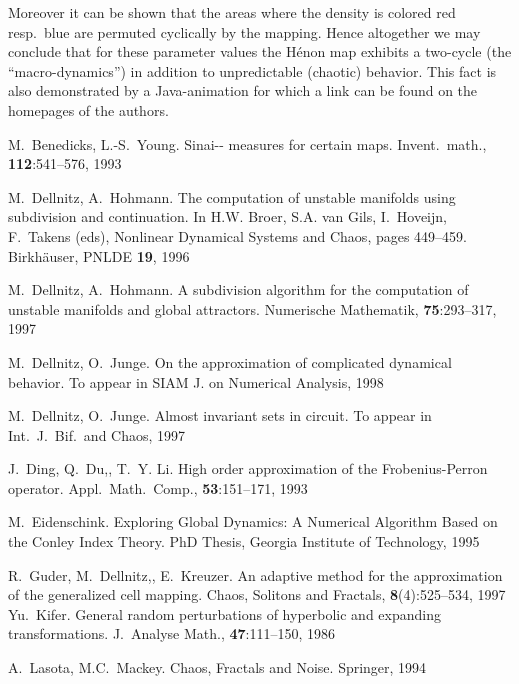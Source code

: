 \documentclass[cvs,envcountsect]{svjour}
\begin{document}
Moreover it can be shown that the areas
where the density is colored red resp.\ blue
are permuted cyclically by the mapping.  Hence altogether
we may conclude that for these parameter values the H\'enon
map exhibits a two-cycle (the ``macro-dynamics'') in addition to
unpredictable (chaotic) behavior.  This fact is also demonstrated
by a {\sf Java}-animation for which a link can be found on the
homepages of the authors.  \thisbottomragged



\begin{thebibliography}{10.}

M.\ Benedicks, L.-S.\ Young.
Sinai-- measures for certain
   maps.
{Invent.\ math.}, {\bf 112}:541--576, 1993

M.\ Dellnitz, A.\ Hohmann.
The computation of unstable manifolds using subdivision and
  continuation.
In H.W. Broer, S.A. van Gils, I.~Hoveijn, F.~Takens (eds),
  {Nonlinear Dynamical Systems and Chaos}, pages 449--459. Birkh\"auser,
  {PNLDE} {\bf 19}, 1996

M.\ Dellnitz, A.\ Hohmann.
A subdivision algorithm for the computation of unstable manifolds and
  global attractors.
{Numerische Mathematik}, {\bf 75}:293--317, 1997

M.\ Dellnitz, O.\ Junge.
On the approximation of complicated dynamical behavior.
To appear in SIAM J. on Numerical Analysis, 1998

M.\ Dellnitz, O.\ Junge.
Almost invariant sets in  circuit.
To appear in {Int.\ J.\ Bif.\ and Chaos}, 1997

J.~Ding, Q.~Du,, T.~Y. Li.
High order approximation of the {Frobenius}-{Perron} operator.
{Appl.\ Math.\ Comp.}, {\bf 53}:151--171, 1993

M.\ Eidenschink.
{Exploring Global Dynamics: A Numerical Algorithm Based on the
  Conley Index Theory}.
PhD Thesis, Georgia Institute of Technology, 1995
\newpage

R.\ Guder, M.\ Dellnitz,, E.\ Kreuzer.
An adaptive method for the approximation of the generalized cell
  mapping.
{Chaos, Solitons and Fractals}, {\bf 8}(4):525--534, 1997
Yu.\ Kifer.
General random perturbations of hyperbolic and expanding
  transformations.
{J.\ Analyse Math.}, {\bf 47}:111--150, 1986

A.\ Lasota, M.C.\ Mackey.
{Chaos, Fractals and Noise}.
Springer, 1994

\end{thebibliography}
\end{document}
